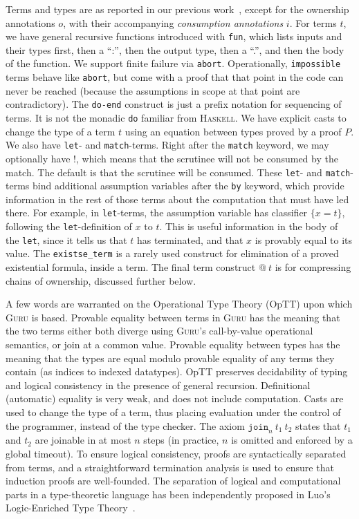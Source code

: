 \documentclass[9pt,natbib]{sigplanconf}
\begin{document}
Terms and types are as reported in our previous work~\cite{guru09},
except for the ownership annotations $o$, with their accompanying
\emph{consumption annotations} $i$.  For terms $t$, we have general
recursive functions introduced with \texttt{fun}, which lists inputs
and their types first, then a ``:'', then the output type, then a
``.'', and then the body of the function.  We support finite failure
via \texttt{abort}.  Operationally, \texttt{impossible} terms behave
like \texttt{abort}, but come with a proof that that point in the code
can never be reached (because the assumptions in scope at that point
are contradictory).  The \texttt{do-end} construct is just a prefix
notation for sequencing of terms.  It is not the monadic \texttt{do}
familiar from \textsc{Haskell}.  We have explicit casts to change the
type of a term $t$ using an equation between types proved by a proof
$P$.  We also have \texttt{let}- and \texttt{match}-terms.  Right
after the \texttt{match} keyword, we may optionally have $!$, which
means that the scrutinee will not be consumed by the match.  The
default is that the scrutinee will be consumed.  These \texttt{let}-
and \texttt{match}-terms bind additional assumption variables after
the \texttt{by} keyword, which provide information in the rest of
those terms about the computation that must have led there.  For
example, in \texttt{let}-terms, the assumption variable has classifier
$\{ x = t \}$, following the \texttt{let}-definition of $x$ to $t$.
This is useful information in the body of the \texttt{let}, since it
tells us that $t$ has terminated, and that $x$ is provably equal to
its value.  The \texttt{existse\_term} is a rarely used construct for
elimination of a proved existential formula, inside a term.  The final
term construct $@\ t$ is for compressing chains of ownership,
discussed further below.

A few words are warranted on the Operational Type Theory (OpTT) upon
which \textsc{Guru} is based.  Provable equality between terms in
\textsc{Guru} has the meaning that the two terms either both diverge
using \textsc{Guru}'s call-by-value operational semantics, or join at
a common value.  Provable equality between types has the meaning that
the types are equal modulo provable equality of any terms they contain
(as indices to indexed datatypes).  OpTT preserves decidability of
typing and logical consistency in the presence of general recursion.
Definitional (automatic) equality is very weak, and does not include
computation.  Casts are used to change the type of a term, thus
placing evaluation under the control of the programmer, instead of the
type checker.  The axiom $\texttt{join}_n\ t_1\ t_2$ states that $t_1$
and $t_2$ are joinable in at most $n$ steps (in practice, $n$ is
omitted and enforced by a global timeout).  To ensure logical
consistency, proofs are syntactically separated from terms, and a
straightforward termination analysis is used to ensure that induction
proofs are well-founded.  The separation of logical and computational
parts in a type-theoretic language has been independently proposed in
Luo's Logic-Enriched Type Theory~\cite{luo08}.
\end{document}
